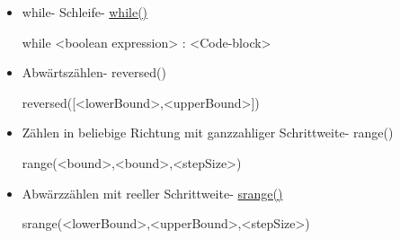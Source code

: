 \documentclass[a4paper,9pt,DIV15,twocolumn]{scrartcl}
\begin{document}
\begin{itemize}
 \item while- Schleife- \href{http://docs.python.org/reference/compound_stmts.html#the-while-statement}{while()}
\begin{sagein}
while <boolean expression> :
    <Code-block>
\end{sagein}
\item Abwärtszählen- reversed()
\begin{sagein}
reversed([<lowerBound>,<upperBound>])
\end{sagein}
\item Z\"ahlen in beliebige Richtung mit ganzzahliger Schrittweite- range()
	\begin{sagein}
range(<bound>,<bound>,<stepSize>)
	\end{sagein}
\item Abw\"arzz\"ahlen mit reeller Schrittweite- \href{https://sage.math.uni-goettingen.de/doc/static/reference/sage/misc/misc.html?highlight=sage.misc.misc#sage.misc.misc.srange}{srange()}
\begin{sagein}
srange(<lowerBound>,<upperBound>,<stepSize>) 
\end{sagein}
\end{itemize}
\end{document}

